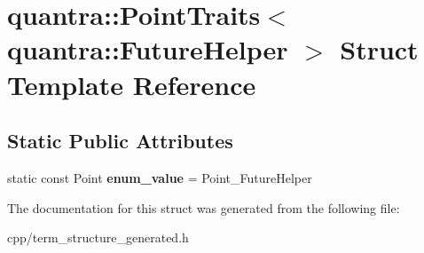 \hypertarget{structquantra_1_1PointTraits_3_01quantra_1_1FutureHelper_01_4}{}\section{quantra\+:\+:Point\+Traits$<$ quantra\+:\+:Future\+Helper $>$ Struct Template Reference}
\label{structquantra_1_1PointTraits_3_01quantra_1_1FutureHelper_01_4}
\subsection*{Static Public Attributes}
\begin{DoxyCompactItemize}
\item 
\mbox{\label{structquantra_1_1PointTraits_3_01quantra_1_1FutureHelper_01_4_a491d5609eba786b376cf197574416056}} 
static const Point {\bfseries enum\+\_\+value} = Point\+\_\+\+Future\+Helper
\end{DoxyCompactItemize}


The documentation for this struct was generated from the following file\+:\begin{DoxyCompactItemize}
\item 
cpp/term\+\_\+structure\+\_\+generated.\+h\end{DoxyCompactItemize}
